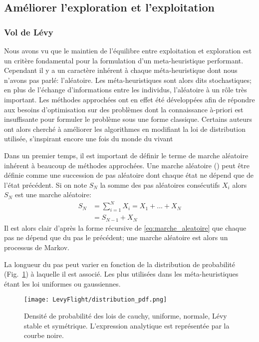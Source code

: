 \subsection{Améliorer l’exploration et l’exploitation} %
\label{sub:ameliorer_l_exploration_et_l_exploitation}

\subsubsection{Vol de Lévy} %
\label{ssub:vol_de_levy}
Nous avons vu que le maintien de l’équilibre entre exploitation et exploration est un
critère fondamental pour la formulation d’un meta-heuristique performant. Cependant il y a un caractère
inhérent à chaque méta-heuristique dont nous n’avons pas parlé: l’aléatoire.
Les méta-heuristiques sont alors dits stochastiques; en plus de l’échange d’informations entre les individus, l’aléatoire
à un rôle très important.
Les méthodes approchées ont en effet été développées afin de répondre aux besoins d’optimisation sur des
problèmes dont la connaissance à-priori est insuffisante pour formuler le problème sous une forme classique.
Certains auteurs ont alors cherché à améliorer les algorithmes en modifiant la loi de
distribution utilisée, s’inspirant encore une fois du monde du vivant

Dans un premier temps, il est important de définir le terme de marche aléatoire inhérent
à beaucoup de méthodes approchées.
Une marche aléatoire (\cite{Yang201445}) peut être définie comme une succession de pas
aléatoire dont chaque état ne dépend que de l’état précédent. Si on note $S_{N}$
la somme des pas aléatoires consécutifs $X_{i}$ alors $S_{N}$ est une marche aléatoire:
\begin{equation}\label{eq:marche_aleatoire}
    \begin{split}
        S_{N} &= \sum_{i=1}^{N} X_{i} = X_{1} + ... + X_{N}\\
              &= S_{N-1} + X_{N}
    \end{split}
\end{equation}
Il est alors clair d’après la forme récursive de \eqref{eq:marche_aleatoire} que chaque pas
ne dépend que du pas le précédent; une marche aléatoire est alors un processus de Markov.


La longueur du pas peut varier en fonction de la distribution de probabilité (Fig.~\ref{fig:distribution_pdf})
à laquelle il est associé. Les plus utilisées dans les méta-heuristiques étant les loi uniformes ou gaussiennes.
\begin{figure}
    \begin{center}
        \texttt{[image: LevyFlight/distribution\_pdf.png]}
    \end{center}
    \caption{Densité de probabilité des lois de cauchy, uniforme, normale, Lévy stable et symétrique.
             L’expression analytique est représentée par la courbe noire.
             \label{fig:distribution_pdf}}
\end{figure}

